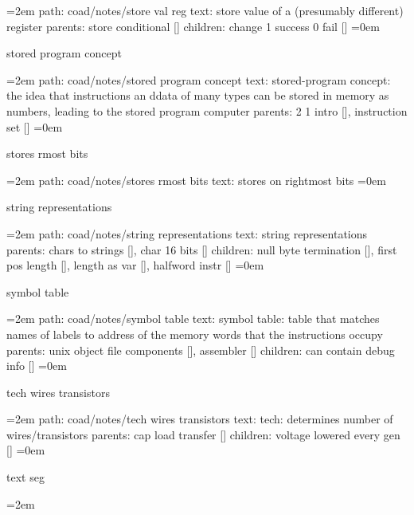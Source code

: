 \leftskip=2em
path: coad/notes/store val reg
\smallskip
text:  store value of a (presumably different) register
\smallskip
parents:  store conditional []
\smallskip
children: change 1 success 0 fail []
\smallskip
\leftskip=0em
\par\endgroup
\bigskip
{}
stored program concept
\smallskip
\par\begingroup
\leftskip=2em
path: coad/notes/stored program concept
\smallskip
text:  stored-program concept: the idea that instructions an ddata of many types can be stored in memory as numbers, leading to the stored program computer
\smallskip
parents:  2 1 intro [], instruction set []
\smallskip
\leftskip=0em
\par\endgroup
\bigskip
{}
stores rmost bits
\smallskip
\par\begingroup
\leftskip=2em
path: coad/notes/stores rmost bits
\smallskip
text:  stores on rightmost bits
\smallskip
\leftskip=0em
\par\endgroup
\bigskip
{}
string representations
\smallskip
\par\begingroup
\leftskip=2em
path: coad/notes/string representations
\smallskip
text:  string representations
\smallskip
parents:  chars to strings [], char 16 bits []
\smallskip
children: null byte termination [], first pos length [], length as var [], halfword instr []
\smallskip
\leftskip=0em
\par\endgroup
\bigskip
{}
symbol table
\smallskip
\par\begingroup
\leftskip=2em
path: coad/notes/symbol table
\smallskip
text:  symbol table: table that matches names of labels to address of the memory words that the instructions occupy
\smallskip
parents:  unix object file components [], assembler []
\smallskip
children: can contain debug info []
\smallskip
\leftskip=0em
\par\endgroup
\bigskip
{}
tech wires transistors
\smallskip
\par\begingroup
\leftskip=2em
path: coad/notes/tech wires transistors
\smallskip
text:  tech: determines number of wires/transistors
\smallskip
parents:  cap load transfer []
\smallskip
children: voltage lowered every gen []
\smallskip
\leftskip=0em
\par\endgroup
\bigskip
{}
text seg
\smallskip
\par\begingroup
\leftskip=2em
